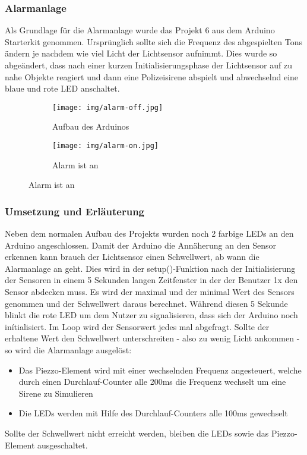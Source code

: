 \subsubsection{Alarmanlage}
Als Grundlage für die Alarmanlage wurde das Projekt 6 aus dem Arduino Starterkit genommen. Ursprünglich sollte sich die Frequenz des abgespielten Tons ändern je nachdem wie viel Licht der Lichtsensor aufnimmt. Dies wurde so abgeändert, dass nach einer kurzen Initialisierungsphase der Lichtsensor auf zu nahe Objekte reagiert und dann eine Polizeisirene abspielt und abwechselnd eine blaue und rote LED anschaltet.

\begin{figure}[h]
	\centering
	\begin{subfigure}[b]{0.48\linewidth}
		\centering
		\texttt{[image: img/alarm-off.jpg]}
		\caption{Aufbau des Arduinos}
	\end{subfigure}\enspace%
	\begin{subfigure}[b]{0.48\linewidth}
		\centering
		\texttt{[image: img/alarm-on.jpg]}
		\caption{Alarm ist an}
	\end{subfigure}
\end{figure}

\subsubsection{Umsetzung und Erläuterung}
Neben dem normalen Aufbau des Projekts wurden noch 2 farbige LEDs an den Arduino angeschlossen.
Damit der Arduino die Annäherung an den Sensor erkennen kann brauch der Lichtsensor einen Schwellwert, ab wann die Alarmanlage an geht. Dies wird in der setup()-Funktion nach der Initialisierung der Sensoren in einem 5 Sekunden langen Zeitfenster in der der Benutzer 1x den Sensor abdecken muss. Es wird der maximal und der minimal Wert des Sensors genommen  und der Schwellwert daraus berechnet. Während diesen 5 Sekunde blinkt die rote LED um dem Nutzer zu signalisieren, dass sich der Arduino noch inítialisiert.
Im Loop wird der Sensorwert jedes mal abgefragt. Sollte der erhaltene Wert den Schwellwert unterschreiten - also zu wenig Licht ankommen - so wird die Alarmanlage ausgelöst: 
\begin{itemize}
\item Das Piezzo-Element wird mit einer wechselnden Frequenz angesteuert, welche durch einen Durchlauf-Counter alle 200ms die Frequenz wechselt um eine Sirene zu Simulieren
\item Die LEDs werden mit Hilfe des Durchlauf-Counters alle 100ms gewechselt
\end{itemize}
Sollte der Schwellwert nicht erreicht werden, bleiben die LEDs sowie das Piezzo-Element ausgeschaltet.

